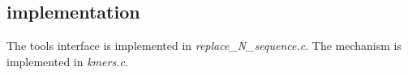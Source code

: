 \subsection{implementation}
The tools interface is implemented in
\emph{replace\_N\_sequence.c}. The mechanism is implemented in
\emph{kmers.c}.


